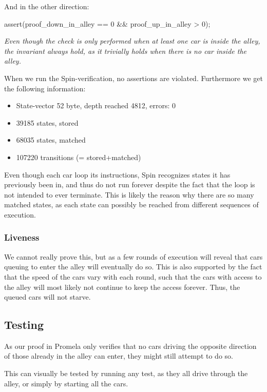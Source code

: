 And in the other direction:
\begin{promela}
assert(proof_down_in_alley == 0 && proof_up_in_alley > 0);
\end{promela}

\emph{Even though the check is only performed when at least one car is
  inside the alley, the invariant always hold, as it trivially holds
  when there is no car inside the alley.}

When we run the Spin-verification, no assertions are
violated. Furthermore we get the following information:
\begin{itemize}
	\item State-vector 52 byte, depth reached 4812, errors: 0
	\item 39185 states, stored
	\item 68035 states, matched
	\item 107220 transitions (= stored+matched)
\end{itemize}

Even though each car loop its instructions, Spin recognizes states it
has previously been in, and thus do not run forever despite the fact
that the loop is not intended to ever terminate. This is likely the
reason why there are so many matched states, as each state can
possibly be reached from different sequences of execution.

\subsubsection{Liveness}
We cannot really prove this, but as a few rounds of execution will
reveal that cars queuing to enter the alley will eventually do
so. This is also supported by the fact that the speed of the cars vary
with each round, such that the cars with access to the alley will most
likely not continue to keep the access forever. Thus, the queued cars
will not starve.


\subsection{Testing}
\label{sub:all-test}
As our proof in Promela only verifies that no cars driving the
opposite direction of those already in the alley can enter, they might
still attempt to do so.

This can visually be tested by running any test, as they all drive
through the alley, or simply by starting all the cars.
